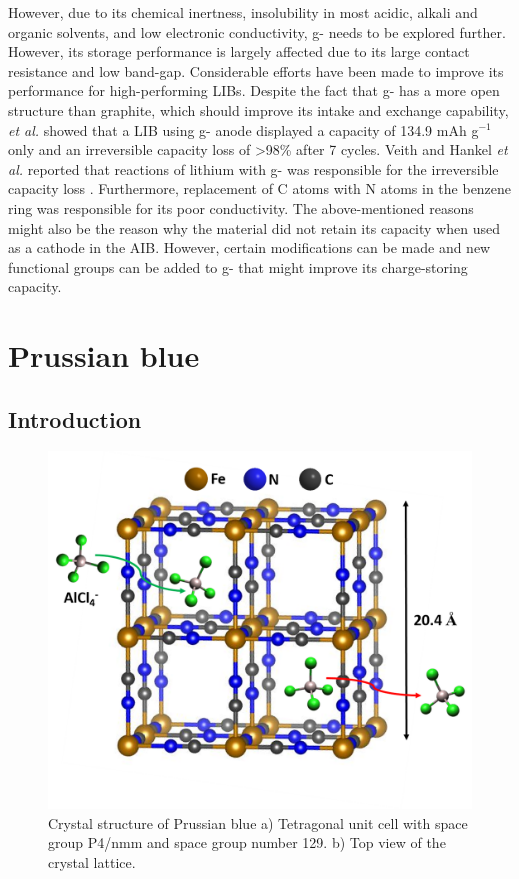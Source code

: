 However, due to its chemical inertness, insolubility in most acidic, alkali and organic solvents, and low electronic conductivity, g- needs to be explored further. However, its storage performance is largely affected due to its large contact resistance and low band-gap. Considerable efforts have been made to improve its performance for high-performing LIBs. Despite the fact that g- has a more open structure than graphite, which should improve its  intake and exchange capability, \cite{luo_graphitic_2019} \textit{et al.} showed that a LIB using g- anode displayed a capacity of 134.9 mAh g$^{-1}$ only and an irreversible capacity loss of >98\% after 7 cycles. Veith and Hankel \textit{et al.} reported that reactions of lithium with g- was responsible for the irreversible capacity loss \cite{veith_electrochemical_2013, hankel_lithium_2015}. Furthermore, replacement of C atoms with N atoms in the benzene ring was responsible for its poor conductivity. The above-mentioned reasons might also be the reason why the material did not retain its capacity when used as a cathode in the AIB. However, certain modifications can be made and new functional groups can be added to g- that might improve its charge-storing capacity.

\section{Prussian blue}

\subsection{Introduction}

 \begin{figure}[tbh!]
  \centering
  \includegraphics[width=\textwidth]{Figures/chap6fig/pbcrys}
    \caption{Crystal structure of Prussian blue a) Tetragonal unit cell with space group P4/nmm and space group number 129. b) Top view of the crystal lattice.}
  \label{Figures/chap6fig:pbcrys}
\end{figure}


